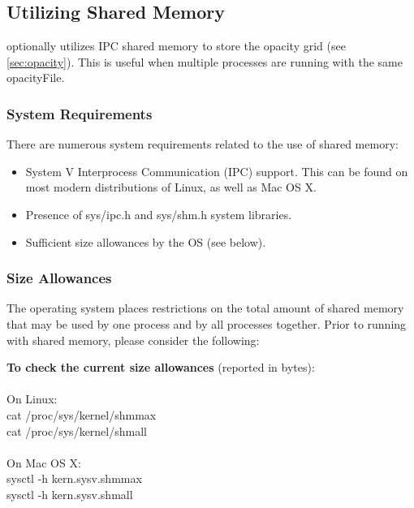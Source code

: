 \documentclass[letterpaper, 12pt]{article}
\begin{document}
\subsection{Utilizing Shared Memory}
\label{sec:sharedmem}

{\transit} optionally utilizes IPC shared memory to store the opacity
grid (see \ref{sec:opacity}). This is useful when multiple {\transit}
processes are running with the same {\tttb opacityFile}.

\subsubsection{System Requirements}

There are numerous system requirements related to the use of shared
memory:

\begin{itemize}
\setlength\itemsep{0ex}
\setlength\topsep{0ex}
\setlength\partopsep{0ex}
\setlength\parsep{0ex}
\item System V Interprocess Communication (IPC) support. This can be
      found on most modern distributions of Linux, as well as Mac OS X.
\item Presence of {\tttm sys/ipc.h} and {\tttm sys/shm.h} system libraries.
\item Sufficient size allowances by the OS (see below).
\end{itemize}

\subsubsection{Size Allowances}

The operating system places restrictions on the total amount of shared
memory that may be used by one process and by all processes together.
Prior to running {\transit} with shared memory, please consider the
following: \newline

\noindent
{\bf To check the current size allowances} (reported in bytes): \\
\\
On Linux: \\
{\tttm cat /proc/sys/kernel/shmmax} \\
{\tttm cat /proc/sys/kernel/shmall} \\
\\
On Mac OS X: \\
{\tttm sysctl -h kern.sysv.shmmax} \\
{\tttm sysctl -h kern.sysv.shmall} \\
\end{document}
